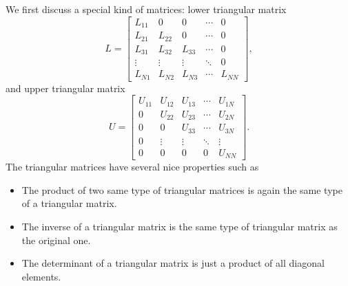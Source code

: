 We first discuss a special kind of matrices: lower triangular matrix
\begin{equation}\label{eq:matrix_L}
L = \begin{bmatrix} L_{11} & 0 & 0 & \cdots & 0 \\ L_{21} & L_{22} & 0 & \cdots & 0\\ L_{31} & L_{32} & L_{33} & \cdots & 0 \\
 \vdots & \vdots & \vdots & \ddots  & 0 \\
L_{N1} & L_{N2}& L_{N3}& \cdots &L_{NN}
 \end{bmatrix},
\end{equation}
and upper triangular matrix
\begin{equation}\label{eq:matrix_U}
U = \begin{bmatrix} U_{11} & U_{12} & U_{13} & \cdots & U_{1N} \\0 & U_{22} & U_{23}  & \cdots & U_{2N} \\ 0 & 0 & U_{33}  & \cdots & U_{3N} \\0 & \vdots & \vdots & \ddots & \vdots \\ 0& 0& 0& 0& U_{NN} \end{bmatrix}.
\end{equation}
The triangular matrices have several nice properties such as
\begin{center}
\begin{minipage}{6in}
\begin{itemize}[labelwidth=0.5cm,labelindent=0cm,leftmargin=*,align=left]
\item The product of two same type of triangular matrices is again the same type of a triangular matrix.
\item The inverse of a triangular matrix is the same type of triangular matrix as the original one.
\item The determinant of a triangular matrix is just a product of all diagonal elements.
\end{itemize}
\end{minipage}
\end{center}

